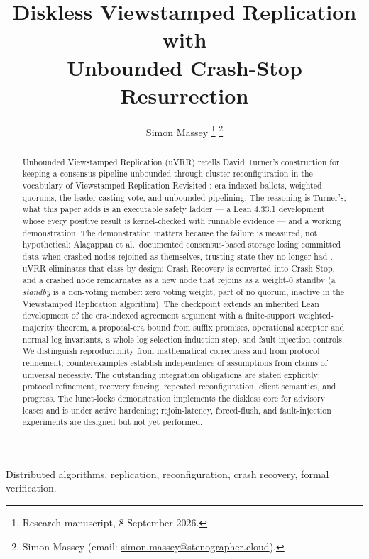 \documentclass[10pt,journal,letterpaper]{IEEEtran}
\title{Diskless Viewstamped Replication with\\Unbounded Crash-Stop Resurrection}
\author{Simon Massey%
\thanks{Research manuscript, 8 September 2026.}%
\thanks{Simon Massey (email: \href{mailto:simon.massey@stenographer.cloud}{simon.massey@stenographer.cloud}).}}
\date{}
\begin{document}
\maketitle
\thispagestyle{uvrrfirst}
\begin{abstract}
Unbounded Viewstamped Replication (uVRR) retells David Turner's construction
for keeping a consensus pipeline unbounded through cluster reconfiguration
\cite{turner} in the vocabulary of Viewstamped Replication Revisited
\cite{vrr}: era-indexed ballots, weighted quorums, the leader casting vote,
and unbounded pipelining. The reasoning is Turner's; what this paper adds is
an executable safety ladder --- a Lean 4.33.1 development whose every positive
result is kernel-checked with runnable evidence --- and a working
demonstration. The demonstration matters because the failure is measured,
not hypothetical: Alagappan et al.\ documented consensus-based storage
losing committed data when crashed nodes rejoined as themselves, trusting
state they no longer had
\cite{alagappan2018}. uVRR eliminates that class by design: Crash-Recovery is
converted into Crash-Stop, and a crashed node reincarnates as a new node that
rejoins as a weight-0 standby (a \emph{standby} is a non-voting member: zero
voting weight, part of no quorum, inactive in the Viewstamped Replication
algorithm). The checkpoint extends an inherited Lean development of the
era-indexed agreement argument with a finite-support weighted-majority
theorem, a proposal-era bound from suffix promises, operational acceptor and
normal-log invariants, a whole-log selection induction step, and
fault-injection controls. We distinguish reproducibility from mathematical
correctness and from protocol refinement; counterexamples establish
independence of assumptions from claims of universal necessity. The
outstanding integration obligations are stated explicitly: protocol
refinement, recovery fencing, repeated reconfiguration, client semantics,
and progress. The lunet-locks demonstration implements the diskless core for
advisory leases and is under active hardening; rejoin-latency, forced-flush,
and fault-injection experiments are designed but not yet performed.
\end{abstract}
\begin{IEEEkeywords}
Distributed algorithms, replication, reconfiguration, crash recovery, formal verification.
\end{IEEEkeywords}
\end{document}
